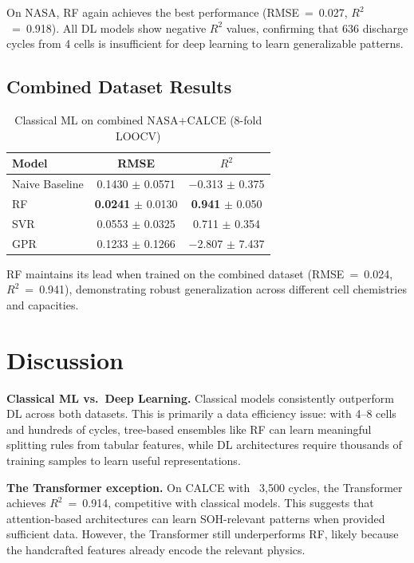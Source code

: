 \documentclass[11pt,a4paper]{article}
\begin{document}
On NASA, RF again achieves the best performance (RMSE~=~0.027, $R^2$~=~0.918). All DL models show negative $R^2$ values, confirming that 636 discharge cycles from 4 cells is insufficient for deep learning to learn generalizable patterns.

\subsection{Combined Dataset Results}

\begin{table}[H]
\centering
\caption{Classical ML on combined NASA+CALCE (8-fold LOOCV)}
\label{tab:combined_results}
\begin{tabular}{lcc}
\toprule
\textbf{Model} & \textbf{RMSE} & \textbf{$R^2$} \\
\midrule
Naive Baseline & 0.1430 $\pm$ 0.0571 & $-$0.313 $\pm$ 0.375 \\
RF & \textbf{0.0241} $\pm$ 0.0130 & \textbf{0.941} $\pm$ 0.050 \\
SVR & 0.0553 $\pm$ 0.0325 & 0.711 $\pm$ 0.354 \\
GPR & 0.1233 $\pm$ 0.1266 & $-$2.807 $\pm$ 7.437 \\
\bottomrule
\end{tabular}
\end{table}

RF maintains its lead when trained on the combined dataset (RMSE~=~0.024, $R^2$~=~0.941), demonstrating robust generalization across different cell chemistries and capacities.

\section{Discussion}
\label{sec:discussion}

\textbf{Classical ML vs.\ Deep Learning.} Classical models consistently outperform DL across both datasets. This is primarily a data efficiency issue: with 4--8 cells and hundreds of cycles, tree-based ensembles like RF can learn meaningful splitting rules from tabular features, while DL architectures require thousands of training samples to learn useful representations.

\textbf{The Transformer exception.} On CALCE with ~3,500 cycles, the Transformer achieves $R^2$~=~0.914, competitive with classical models. This suggests that attention-based architectures can learn SOH-relevant patterns when provided sufficient data. However, the Transformer still underperforms RF, likely because the handcrafted features already encode the relevant physics.
\end{document}
